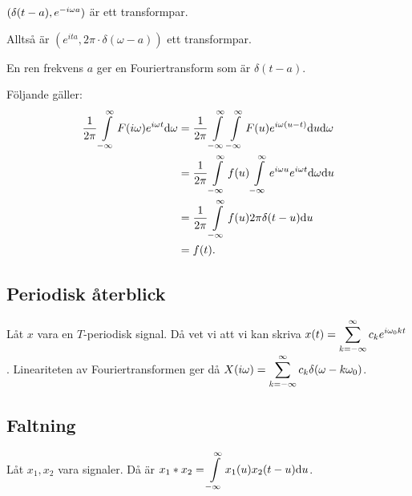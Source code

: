 \documentclass[a4paper]{article}
\begin{document}
\begin{ex}
    \(
        (\delta(t-a), e^{-i\omega a})
    \) är ett transformpar.

    Alltså är \(
        (e^{ita}, 2\pi \cdot \delta(\omega-a))
    \) ett transformpar.

    En ren frekvens \(
        a
    \) ger en Fouriertransform som är \( 
        \delta(t-a)
    \).
\end{ex}

Följande gäller: \begin{align*}
    \frac{1}{2\pi} \displaystyle\int\limits_{-\infty}^{\infty} F(i\omega) e^{i\omega t} \dd \omega
    &= \frac{1}{2\pi} \displaystyle\int\limits_{-\infty}^{\infty} \displaystyle\int\limits_{-\infty}^{\infty} F(u) e^{i\omega (u-t)} \dd u \dd \omega\\
    &= \frac{1}{2\pi} \displaystyle\int\limits_{-\infty}^{\infty} f(u) \displaystyle\int\limits_{-\infty}^{\infty} e^{i\omega u} e^{i\omega t} \dd \omega \dd u\\
    &= \frac{1}{2\pi} \displaystyle\int\limits_{-\infty}^{\infty} f(u) 2\pi \delta(t-u) \dd u\\
    &= f(t).
\end{align*}

\subsection{Periodisk återblick}
Låt \(
    x
\) vara en \(
    T
\)-periodisk signal. Då vet vi att vi kan skriva \(
    x(t) = \displaystyle\sum_{k=-\infty}^\infty c_k e^{i\omega_0 k t}
\). Lineariteten av Fouriertransformen ger då \(
    X(i\omega) = \displaystyle\sum_{k=-\infty}^\infty c_k \delta(\omega - k \omega_0)
\).

\subsection{Faltning}
Låt \(
    x_1, x_2
\) vara signaler. Då är \(
    x_1 * x_2 = \displaystyle\int\limits_{-\infty}^{\infty} x_1(u) x_2(t-u) \dd u
\). 
\end{document}
